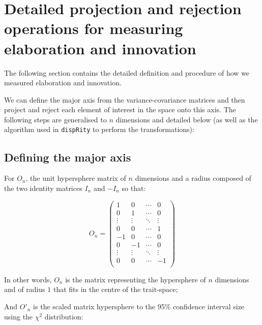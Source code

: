 \documentclass[12pt,a4paper]{article}
\begin{document}
%
%

\newpage

\section{Detailed projection and rejection operations for measuring elaboration and innovation}
\label{supp_projection}

The following section contains the detailed definition and procedure of how we measured elaboration and innovation.

We can define the major axis from the variance-covariance matrices and then project and reject each element of interest in the space onto this axis.
The following steps are generalised to $n$ dimensions and detailed below (as well as the algorithm used in \texttt{dispRity} \cite{dispRity} to perform the transformations):

\subsection{Defining the major axis}

For $O_{n}$, the unit hypersphere matrix of $n$ dimensions and a radius composed of the two identity matrices $I_{n}$ and $-I_{n}$ so that: 

\begin{equation}
O_{n} = 
    \begin{pmatrix}
        1 & 0 & \cdots & 0 \\
        0 & 1 & \cdots & 0 \\
        \vdots  & \vdots  & \ddots & \vdots  \\
        0 & 0 & \cdots & 1 \\
        -1 & 0 & \cdots & 0 \\
        0 & -1 & \cdots & 0 \\
        \vdots  & \vdots  & \ddots & \vdots  \\
        0 & 0 & \cdots & -1 \\
    \end{pmatrix}
\end{equation}

In other words, $O_{n}$ is the matrix representing the hypersphere of $n$ dimensions and of radius $1$ that fits in the centre of the trait-space;

And $O'_{n}$ is the scaled matrix hypersphere to the 95\% confidence interval size using the $\chi^2$ distribution:
\end{document}

